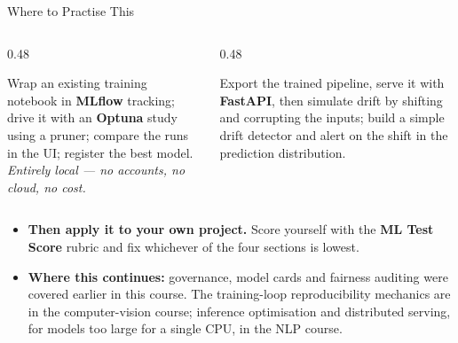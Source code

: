 \begin{frame}{Where to Practise This}

    \begin{columns}[T]
        \begin{column}{0.48\textwidth}
            \begin{tcolorbox}[colback=gray!8, colframe=gray!60, title=\small Exercise 1 --- Tracking and tuning]
                \small
                Wrap an existing training notebook in \textbf{MLflow} tracking; drive it with an
                \textbf{Optuna} study using a pruner; compare the runs in the UI; register the best model.
                \vspace{0.3em}
                \\ \textit{Entirely local --- no accounts, no cloud, no cost.}
            \end{tcolorbox}
        \end{column}
        \begin{column}{0.48\textwidth}
            \begin{tcolorbox}[colback=gray!8, colframe=gray!60, title=\small Exercise 2 --- Serving and drift]
                \small
                Export the trained pipeline, serve it with \textbf{FastAPI}, then simulate drift by shifting
                and corrupting the inputs; build a simple drift detector and alert on the shift in the
                prediction distribution.
            \end{tcolorbox}
        \end{column}
    \end{columns}

    \vspace{0.6em}
    \begin{itemize}
        \item \textbf{Then apply it to your own project.} Score yourself with the \textbf{ML Test Score}
              rubric and fix whichever of the four sections is lowest.
        \item \textbf{Where this continues:} governance, model cards and fairness auditing were covered
              earlier in this course. The training-loop reproducibility mechanics are in the
              computer-vision course; inference optimisation and distributed serving, for models too
              large for a single CPU, in the NLP course.
    \end{itemize}

\end{frame}
